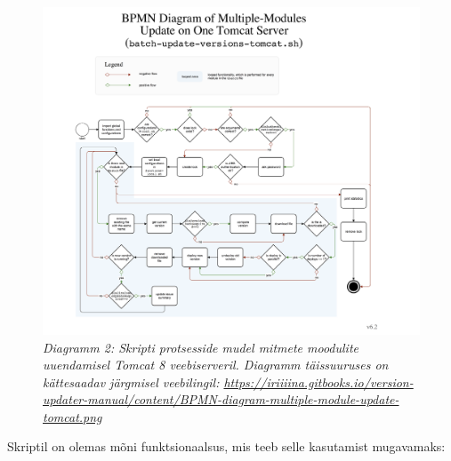 \documentclass[12pt]{report}
\begin{document}
   \begin{figure}[H]
     \begin{center}
       \includegraphics[width=\textwidth]{diagrams/BPMN-diagram-multiple-module-update-tomcat.png}
       \caption*{\textit{Diagramm 2: Skripti protsesside mudel mitmete moodulite uuendamisel Tomcat 8 veebiserveril. Diagramm täissuuruses on kättesaadav järgmisel veebilingil: \url{https://iriiiina.gitbooks.io/version-updater-manual/content/BPMN-diagram-multiple-module-update-tomcat.png}}}
     \end{center}
   \end{figure}

  Skriptil on olemas mõni funktsionaalsus, mis teeb selle kasutamist mugavamaks:
  
\end{document}
